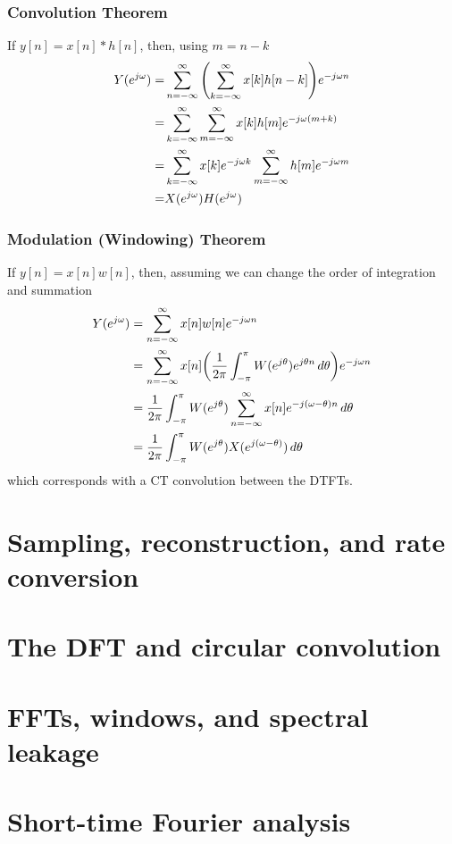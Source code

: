 \documentclass{article}
\newcommand{\jw}{{j\omega}}
\newcommand{\w}{\omega}
\begin{document}
\subsubsection{Convolution Theorem}
If $y[n]=x[n]*h[n]$, then, using $m=n-k$
\begin{align*}
	Y(e^\jw) =& \sum_{n=-\infty}^\infty \qty(\sum_{k=-\infty}^\infty x[k]h[n-k])e^{-\jw n}\\
	         =& \sum_{k=-\infty}^\infty \sum_{m=-\infty}^\infty x[k]h[m]e^{-\jw (m+k)}\\
	         =& \sum_{k=-\infty}^\infty x[k]e^{-\jw k}  \sum_{m=-\infty}^\infty h[m]e^{-\jw m}\\
			=& X(e^\jw)H(e^\jw)
\end{align*}

\subsubsection{Modulation (Windowing) Theorem}
If $y[n] = x[n]w[n]$, then, assuming we can change the order of integration and summation
\begin{align*}
    Y(e^\jw) &= \sum_{n=-\infty}^\infty x[n] w[n] e^{-\jw n}\\
             &= \sum_{n=-\infty}^\infty x[n] \qty(\frac{1}{2\pi}\int_{-\pi}^\pi W(e^{j\theta})e^{j\theta n}\,d\theta) e^{-\jw n}\\
             &= \frac{1}{2\pi}\int_{-\pi}^\pi  W(e^{j\theta})\sum_{n=-\infty}^\infty x[n]e^{-j(\w-\theta) n} \,d\theta\\
             &= \frac{1}{2\pi}\int_{-\pi}^\pi  W(e^{j\theta}) X(e^{j(\w - \theta)}) \,d\theta
\end{align*}
which corresponds with a CT convolution between the DTFTs.

\section{Sampling, reconstruction, and rate conversion}

\iffalse

\section{The DFT and circular convolution}
\section{FFTs, windows, and spectral leakage}
\section{Short-time Fourier analysis}
\end{document}
